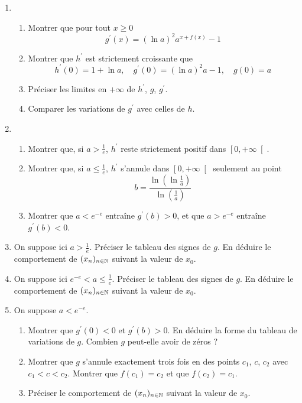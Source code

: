 \begin{enumerate}
\item
\begin{enumerate}
\item  Montrer que  pour tout $x\geq 0$
\[
g^{\prime }(x)=(\ln a)^{2}a^{x+f(x)}-1
\]

\item  Montrer que $h^{\prime }$ est strictement croissante que
\[
h^{\prime }(0)=1+\ln a,\quad g^{\prime }(0)=(\ln a)^{2}a-1,\quad g(0)=a
\]

\item Préciser les limites en $+\infty$ de $h^{\prime}$, $g$, $g^{\prime}$.

\item  Comparer les variations de $g^{\prime }$ avec celles de $h$.
\end{enumerate}

\item
\begin{enumerate}
\item  Montrer que, si $a>\frac{1}{e}$, $h^{\prime }$ reste strictement positif dans $\left[ 0,+\infty \right[ $.

\item  Montrer que, si $a\leq \frac{1}{e}$, $h^{\prime }$ s'annule dans $\left[ 0,+\infty \right[ $ seulement au point
\[
b=\frac{\ln (\ln \frac{1}{a})}{\ln (\frac{1}{a})}
\]

\item  Montrer que $a<e^{-e}$ entra\^{i}ne $g^{\prime }(b)>0$, et que $a>e^{-e}$ entra\^{i}ne $g^{\prime }(b)<0$.
\end{enumerate}

\item  On suppose ici $a>\frac{1}{e}$. Pr{\'e}ciser le tableau des signes de $g$. En d{\'e}duire le comportement de $(x_{n})_{n\in \mathbb{N}}$ suivant la valeur de $x_{0}$.

\item  On suppose ici $e^{-e}<a\leq \frac{1}{e}$. Pr{\'e}ciser le tableau des signes de $g$. En d{\'e}duire le comportement de $(x_{n})_{n\in \mathbb{N}}$ suivant la valeur de $x_{0}$.

\item  On suppose $a<e^{-e}$.

\begin{enumerate}
\item  Montrer que $g^{\prime }(0)<0$ et $g^{\prime }(b)>0$. En d{\'e}duire
la forme du tableau de variations de $g$. Combien $g$ peut-elle avoir de zéros ?

\item  Montrer que $g$ s'annule exactement trois fois en des points $c_{1}$,
$c$, $c_{2}$ avec $c_{1}<c<c_{2}$. Montrer que $f(c_1)=c_2$ et que $f(c_2)=c_1$.
\item  Pr{\'e}ciser le comportement de $(x_{n})_{n\in \mathbb{N}}$ suivant la valeur de $x_{0}$.
\end{enumerate}
\end{enumerate}

